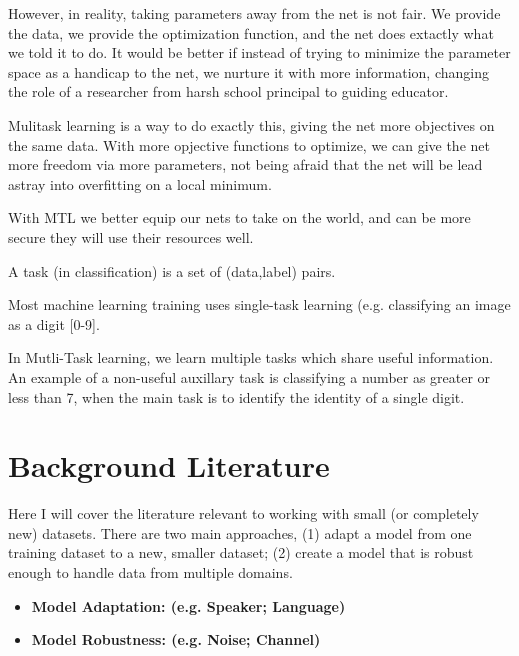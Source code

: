 \documentclass[10pt,a4paper]{article}
\begin{document}
However, in reality, taking parameters away from the net is not fair. We provide the data, we provide the optimization function, and the net does extactly what we told it to do. It would be better if instead of trying to minimize the parameter space as a handicap to the net, we nurture it with more information, changing the role of a researcher from harsh school principal to guiding educator.

Mulitask learning is a way to do exactly this, giving the net more objectives on the same data. With more opjective functions to optimize, we can give the net more freedom via more parameters, not being afraid that the net will be lead astray into overfitting on a local minimum.

With MTL we better equip our nets to take on the world, and can be more secure they will use their resources well.

A task (in classification) is a set of (data,label) pairs.

Most machine learning training uses single-task learning (e.g. classifying an image as a digit [0-9].

In Mutli-Task learning, we learn multiple tasks which share useful information. An example of a non-useful auxillary task is classifying a number as greater or less than 7, when the main task is to identify the identity of a single digit.






\newpage

\section{Background Literature}

Here I will cover the literature relevant to working with small (or completely new) datasets. There are two main approaches, (1) adapt a model from one training dataset to a new, smaller dataset; (2) create a model that is robust enough to handle data from multiple domains. 

\begin{itemize}

\item \textbf{Model Adaptation: (e.g. Speaker; Language)}

    
  
\item \textbf{Model Robustness: (e.g. Noise; Channel)}

  
\end{itemize}
\end{document}
